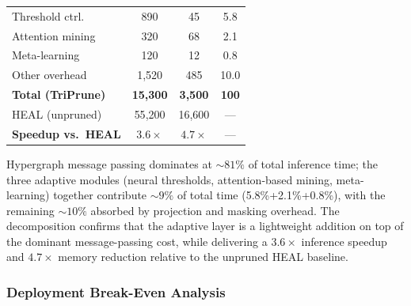 \documentclass[10pt]{article}
\theoremstyle{plain}
\theoremstyle{definition}
\begin{document}
\begin{table}[ht!]
\begin{minipage}[t]{0.45\textwidth}
\begin{tabular}{lccc}
Threshold ctrl.\ & 890      & 45      & 5.8  \\
\rowcolor{gray!8}
Attention mining & 320      & 68      & 2.1  \\
Meta-learning    & 120      & 12      & 0.8  \\
\rowcolor{gray!8}
Other overhead   & 1{,}520  & 485     & 10.0 \\
\midrule
\rowcolor{blue!10}
\textbf{Total (TriPrune)}
                 & \textbf{15{,}300} & \textbf{3{,}500} & \textbf{100} \\
HEAL (unpruned)  & 55{,}200          & 16{,}600         & --- \\
\midrule
\textbf{Speedup vs.\ HEAL}
                 & $\mathbf{3.6\times}$ & $\mathbf{4.7\times}$ & --- \\
\bottomrule
\end{tabular}
\end{minipage}
\end{table}

Hypergraph message passing dominates at $\sim\!81\%$ of total inference time; the three adaptive modules (neural thresholds, attention-based mining, meta-learning) together contribute $\sim\!9\%$ of total time (5.8\%+2.1\%+0.8\%), with the remaining $\sim\!10\%$ absorbed by projection and masking overhead. The decomposition confirms that the adaptive layer is a lightweight addition on top of the dominant message-passing cost, while delivering a $3.6\times$ inference speedup and $4.7\times$ memory reduction relative to the unpruned HEAL baseline.

\subsubsection{Deployment Break-Even Analysis}
\label{sec:breakeven}
\end{document}
